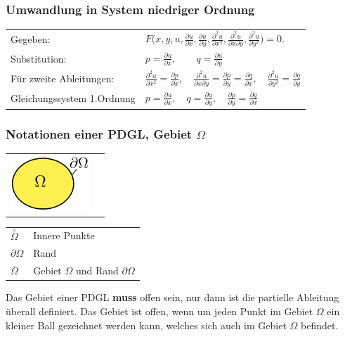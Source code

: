 \subsubsection{Umwandlung in System niedriger Ordnung}

\begin{tabular}{ll}
Gegeben:& $F\biggl(x,y,u,\frac{\partial u}{\partial x},\frac{\partial u}{\partial y},
\frac{\partial^2 u}{\partial x^2},\frac{\partial^2 u}{\partial x\partial y},
\frac{\partial^2u}{\partial y^2}\biggr)=0.$\\[0.2cm]
Substitution: & $p=\frac{\partial u}{\partial x},\qquad q=\frac{\partial u}{\partial y}$\\[0.2cm]
Für zweite Ableitungen: & $\frac{\partial^2 u}{\partial x^2}=\frac{\partial p}{\partial x},\quad \frac{\partial^2 u}{\partial x\partial y}=\frac{\partial p}{\partial y}=\frac{\partial q}{\partial x},\quad\frac{\partial^2 u}{\partial y^2}=\frac{\partial q}{\partial y}$\\[0.2cm]
Gleichungssystem 1.Ordnung& $p=\frac{\partial u}{\partial x},\quad q=\frac{\partial u}{\partial y},\quad\frac{\partial p}{\partial y}=\frac{\partial q}{\partial x}$
\end{tabular}

\subsubsection{Notationen einer PDGL, Gebiet $\Omega$}
\begin{minipage}{4cm}
	\begin{tabular}{ll}
	\includegraphics[width=3cm]{Content/Theory/Gebiet}&
	\end{tabular}
\end{minipage}
\begin{minipage}{4cm}	
	\begin{tabular}{ll}
		$\overset{\circ}{\Omega}$ & Innere Punkte\\
		$\partial\Omega$ & Rand\\
		$\overset{\_}{\Omega}$ & Gebiet $\Omega$ und Rand $\partial\Omega$\\
	\end{tabular}
\end{minipage}

Das Gebiet einer PDGL \textbf{muss} offen sein, nur dann ist die partielle
Ableitung überall definiert. Das Gebiet ist offen, wenn um jeden Punkt im Gebiet
$\Omega$ ein kleiner Ball gezeichnet werden kann, welches sich auch im Gebiet $\Omega$ befindet.\\


